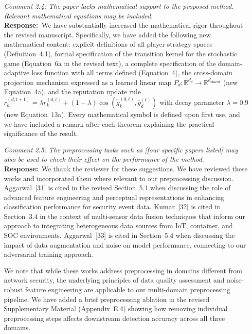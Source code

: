 \documentclass[12pt,a4paper]{article}
\newcommand{\RC}[1]{\noindent\textit{#1}\vspace{0.3em}\\}
\newcommand{\AR}{\noindent\textbf{Response:}~}
\begin{document}
\vspace{0.8em}

\RC{Comment 2.4: The paper lacks mathematical support to the proposed method. Relevant mathematical equations may be included.}

\AR We have substantially increased the mathematical rigor throughout the revised manuscript. Specifically, we have added the following new mathematical content: explicit definitions of all player strategy spaces (Definition~4.1), formal specification of the transition kernel for the stochastic game (Equation~6a in the revised text), a complete specification of the domain-adaptive loss function with all terms defined (Equation~4), the cross-domain projection mechanism expressed as a learned linear map $P_d : \mathbb{R}^{d_d} \to \mathbb{R}^{d_{\text{shared}}}$ (new Equation~4a), and the reputation update rule $r_k^{(d,t+1)} = \lambda r_k^{(d,t)} + (1-\lambda) \cos(\tilde{g}_k^{(d,t)}, \bar{g}_d^{(t)})$ with decay parameter $\lambda = 0.9$ (new Equation~13a). Every mathematical symbol is defined upon first use, and we have included a remark after each theorem explaining the practical significance of the result.

\vspace{0.8em}

\RC{Comment 2.5: The preprocessing tasks such as [four specific papers listed] may also be used to check their effect on the performance of the method.}

\AR We thank the reviewer for these suggestions. We have reviewed these works and incorporated them where relevant to our preprocessing discussion. Aggarwal~[31] is cited in the revised Section~5.1 when discussing the role of advanced feature engineering and perceptual representations in enhancing classification performance for security event data. Kumar~[32] is cited in Section~3.4 in the context of multi-sensor data fusion techniques that inform our approach to integrating heterogeneous data sources from IoT, container, and SOC environments. Aggarwal~[33] is cited in Section~5.4 when discussing the impact of data augmentation and noise on model performance, connecting to our adversarial training approach.

We note that while these works address preprocessing in domains different from network security, the underlying principles of data quality assessment and noise-robust feature engineering are applicable to our multi-domain preprocessing pipeline. We have added a brief preprocessing ablation in the revised Supplementary Material (Appendix~E.4) showing how removing individual preprocessing steps affects downstream detection accuracy across all three domains.
\end{document}
